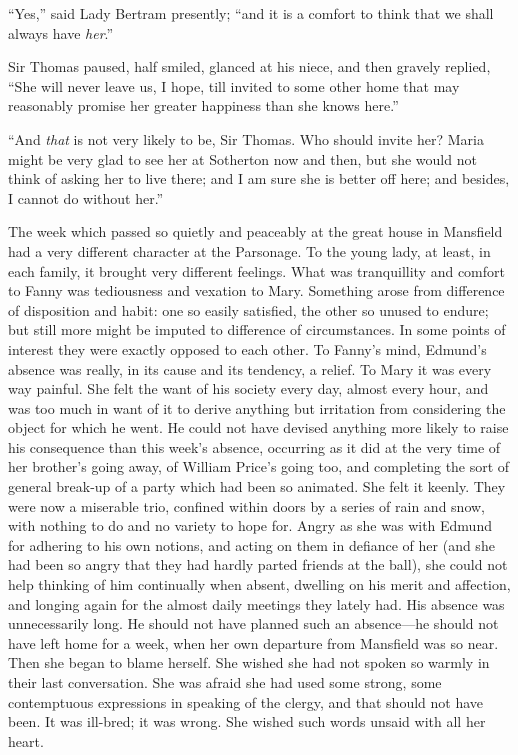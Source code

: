 ``Yes,'' said Lady Bertram presently; ``and it is a comfort
to think that we shall always have \emph{her}.''

Sir Thomas paused, half smiled, glanced at his niece,
and then gravely replied, ``She will never leave us, I hope,
till invited to some other home that may reasonably promise
her greater happiness than she knows here.''

``And \emph{that} is not very likely to be, Sir Thomas.
Who should invite her?  Maria might be very glad to see her
at Sotherton now and then, but she would not think of asking
her to live there; and I am sure she is better off here;
and besides, I cannot do without her.''

The week which passed so quietly and peaceably at the
great house in Mansfield had a very different character at
the Parsonage.  To the young lady, at least, in each family,
it brought very different feelings.  What was tranquillity
and comfort to Fanny was tediousness and vexation to Mary.
Something arose from difference of disposition and habit:
one so easily satisfied, the other so unused to endure;
but still more might be imputed to difference
of circumstances.  In some points of interest they
were exactly opposed to each other.  To Fanny's mind,
Edmund's absence was really, in its cause and its tendency,
a relief.  To Mary it was every way painful.  She felt
the want of his society every day, almost every hour,
and was too much in want of it to derive anything but
irritation from considering the object for which he went.
He could not have devised anything more likely to raise
his consequence than this week's absence, occurring as
it did at the very time of her brother's going away,
of William Price's going too, and completing the sort
of general break-up of a party which had been so animated.
She felt it keenly.  They were now a miserable trio,
confined within doors by a series of rain and snow,
with nothing to do and no variety to hope for.  Angry as
she was with Edmund for adhering to his own notions,
and acting on them in defiance of her (and she had been
so angry that they had hardly parted friends at the ball),
she could not help thinking of him continually when absent,
dwelling on his merit and affection, and longing again
for the almost daily meetings they lately had.  His absence
was unnecessarily long.  He should not have planned such
an absence---he should not have left home for a week,
when her own departure from Mansfield was so near.
Then she began to blame herself.  She wished she had not
spoken so warmly in their last conversation.  She was afraid
she had used some strong, some contemptuous expressions
in speaking of the clergy, and that should not have been.
It was ill-bred; it was wrong.  She wished such words unsaid
with all her heart.

